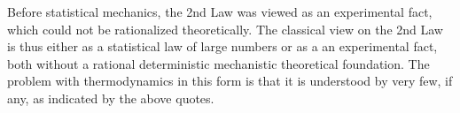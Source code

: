 Before statistical mechanics,
the 2nd Law was viewed as an experimental fact, which could not
be rationalized theoretically. The classical view on the 2nd Law
is thus either as a statistical law of large numbers or as a an 
experimental fact, both without a rational deterministic mechanistic 
theoretical foundation. The problem with thermodynamics in this form
is that it is understood by very few, if any, as indicated by the above quotes.


